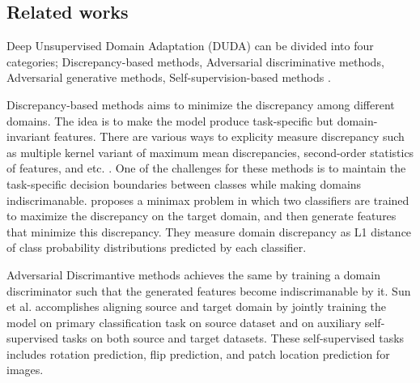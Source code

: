 \documentclass[conference]{IEEEtran}
\begin{document}
\subsection{Related works}
Deep Unsupervised Domain Adaptation (DUDA) can be divided into four categories; Discrepancy-based methods, Adversarial discriminative methods, Adversarial generative methods, Self-supervision-based methods \cite{Zhao2022}.

Discrepancy-based methods aims to minimize the discrepancy among different domains. The idea is to make the model produce task-specific but domain-invariant features. There are various ways to explicity measure discrepancy such as multiple kernel variant of maximum mean discrepancies, second-order statistics of features, and etc. \cite{Zhao2022}. One of the challenges for these methods is to maintain the task-specific decision boundaries between classes \cite{saito2018maximum} while making domains indiscrimanable. \cite{saito2018maximum} proposes a minimax problem in which two classifiers are trained to maximize the discrepancy on the target domain, and then generate features that minimize this discrepancy. They measure domain discrepancy as L1 distance of class probability distributions predicted by each classifier.

Adversarial Discrimantive methods achieves the same by training a domain discriminator such that the generated features become indiscrimanable by it. Sun et al. \cite{sun2019unsupervised} accomplishes aligning source and target domain by jointly training the model on primary classification task on source dataset and on auxiliary self-supervised tasks on both source and target datasets. These self-supervised tasks includes rotation prediction, flip prediction, and patch location prediction for images.

\clearpage


\end{document}
